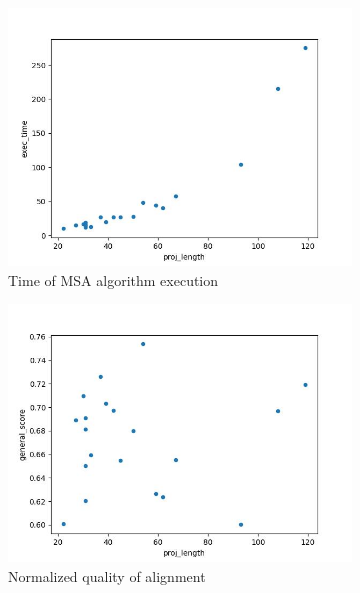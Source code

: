 \documentclass[12pt,a4paper]{article}
\begin{document}
\begin{figure}[H]
	\begin{subfigure}[t]{0.5\linewidth}
		\centering
		\includegraphics[width=1\linewidth]{plots/lenVStime.jpg}
		\caption{Time of MSA algorithm execution}
		\label{sub:graph1}
	\end{subfigure}
	\begin{subfigure}[t]{0.5\linewidth}
		\centering
		\includegraphics[width=1\linewidth]{plots/lenVSgen.jpg}
		\caption{Normalized quality of alignment}
		\label{sub:graph2}	
	\end{subfigure}
	\begin{subfigure}[t]{0.5\linewidth}
		\centering

\end{subfigure}
\end{figure}
\end{document}
